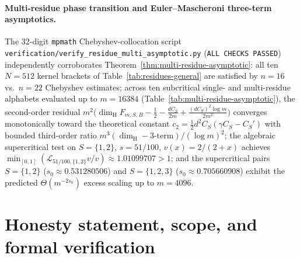 \documentclass[11pt]{article}
\theoremstyle{definition}
\theoremstyle{remark}
\newcommand{\dimH}{\dim_{\mathrm{H}}}
\begin{document}
\paragraph{Multi-residue phase transition and Euler--Mascheroni three-term asymptotics.}
The $32$-digit \texttt{mpmath} Chebyshev-collocation script
\texttt{verification/\allowbreak verify\_\allowbreak residue\_\allowbreak multi\_\allowbreak asymptotic.py}
(\texttt{ALL CHECKS PASSED}) independently corroborates Theorem~\ref{thm:multi-residue-asymptotic}:
all ten $N=512$ kernel brackets of Table~\ref{tab:residues-general} are
satisfied by $n=16$ vs.\ $n=22$ Chebyshev estimates; across ten subcritical
single- and multi-residue alphabets evaluated up to $m=16384$
(Table~\ref{tab:multi-residue-asymptotic}), the second-order residual
$m^2\bigl(\dimH F_{m,S,B}-\frac12-\frac{dC_S}{2m}+\frac{(dC_S)^2\log m}{2m^2}\bigr)$
converges monotonically toward the theoretical constant
$c_2=\frac12 d^2 C_S(\gamma C_S-C_S')$ with bounded third-order ratio
$m^3(\dimH-\text{3-term})/(\log m)^2$; the algebraic supercritical test on
$S=\{1,2\}$, $s=51/100$, $v(x)=2/(2+x)$ achieves
$\min_{[0,1]}(\mathcal L_{51/100,\{1,2\}}v/v)\approx1.01099707>1$; and the
supercritical pairs $S=\{1,2\}$ ($s_0\approx0.531280506$) and $S=\{1,2,3\}$
($s_0\approx0.705660908$) exhibit the predicted $\Theta(m^{-2s_0})$ excess
scaling up to $m=4096$.

\section{Honesty statement, scope, and formal verification}\label{sec:verification}
\end{document}
